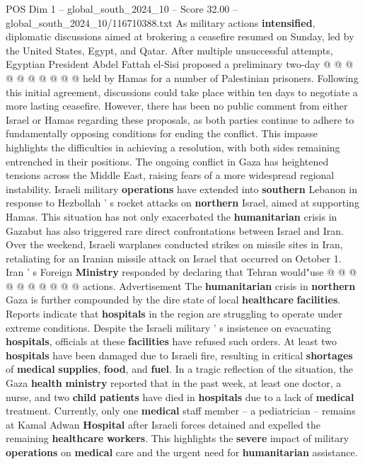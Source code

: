 \begin{textsample}{POS Dim 1 – global\_south\_2024\_10 – Score 32.00 – global\_south\_2024\_10/116710388.txt}
As military actions \textbf{intensified}, diplomatic discussions aimed at brokering a ceasefire resumed on Sunday, led by the United States, Egypt, and Qatar.
After multiple unsuccessful attempts, Egyptian President Abdel Fattah el-Sisi proposed a preliminary two-day @ @ @ @ @ @ @ @ @ @ held by Hamas for a number of Palestinian prisoners.
Following this initial agreement, discussions could take place within ten days to negotiate a more lasting ceasefire.
However, there has been no public comment from either Israel or Hamas regarding these proposals, as both parties continue to adhere to fundamentally opposing conditions for ending the conflict.
This impasse highlights the difficulties in achieving a resolution, with both sides remaining entrenched in their positions.
The ongoing conflict in Gaza has heightened tensions across the Middle East, raising fears of a more widespread regional instability.
Israeli military \textbf{operations} have extended into \textbf{southern} Lebanon in response to Hezbollah ' s rocket attacks on \textbf{northern} Israel, aimed at supporting Hamas.
This situation has not only exacerbated the \textbf{humanitarian} crisis in Gazabut has also triggered rare direct confrontations between Israel and Iran.
Over the weekend, Israeli warplanes conducted strikes on missile sites in Iran, retaliating for an Iranian missile attack on Israel that occurred on October 1.
Iran ' s Foreign \textbf{Ministry} responded by declaring that Tehran would"use @ @ @ @ @ @ @ @ @ @ actions.
Advertisement The \textbf{humanitarian} crisis in \textbf{northern} Gaza is further compounded by the dire state of local \textbf{healthcare} \textbf{facilities}.
Reports indicate that \textbf{hospitals} in the region are struggling to operate under extreme conditions.
Despite the Israeli military ' s insistence on evacuating \textbf{hospitals}, officials at these \textbf{facilities} have refused such orders.
At least two \textbf{hospitals} have been damaged due to Israeli fire, resulting in critical \textbf{shortages} of \textbf{medical} \textbf{supplies}, \textbf{food}, and \textbf{fuel}.
In a tragic reflection of the situation, the Gaza \textbf{health} \textbf{ministry} reported that in the past week, at least one doctor, a nurse, and two \textbf{child} \textbf{patients} have died in \textbf{hospitals} due to a lack of \textbf{medical} treatment.
Currently, only one \textbf{medical} staff member -- a pediatrician -- remains at Kamal Adwan \textbf{Hospital} after Israeli forces detained and expelled the remaining \textbf{healthcare} \textbf{workers}.
This highlights the \textbf{severe} impact of military \textbf{operations} on \textbf{medical} care and the urgent need for \textbf{humanitarian} assistance.

\end{textsample}
